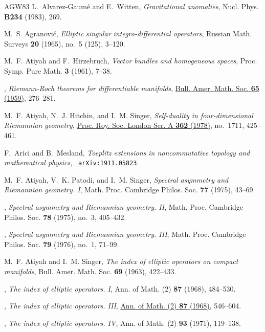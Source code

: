 \documentclass[11pt]{amsart}
\theoremstyle{definition}
\theoremstyle{remark}
\theoremstyle{plain}
\numberwithin{equation}{section}
\renewcommand{\:}{\colon}
\begin{document}
\begin{thebibliography}{AGW83}
L.~Alvarez-Gaum\'e and E.~Witten, \emph{Gravitational anomalies}, Nucl. Phys.
  \textbf{B234} (1983), 269.

M.~S. Agranovi\v{c}, \emph{Elliptic singular integro-differential operators},
  Russian Math. Surveys \textbf{20} (1965), no.~5 (125), 3--120.

M.~F. Atiyah and F.~Hirzebruch, \emph{Vector bundles and homogeneous spaces},
  Proc. Symp. Pure Math. \textbf{3} (1961), 7--38.

\bysame, \emph{Riemann-{R}och theorems for differentiable manifolds},
  \href{http://dx.doi.org/10.1090/S0002-9904-1959-10344-X}{Bull. Amer. Math.
  Soc. \textbf{65} (1959)}, 276--281.

M.~F. Atiyah, N.~J. Hitchin, and I.~M. Singer, \emph{Self-duality in
  four-dimensional {R}iemannian geometry},
  \href{http://dx.doi.org/10.1098/rspa.1978.0143}{Proc. Roy. Soc. London Ser. A
  \textbf{362} (1978)}, no.~1711, 425--461.

F.~Arici and B.~Mesland, \emph{Toeplitz extensions in noncommutative topology
  and mathematical physics}, \href{http://arxiv.org/abs/arXiv:1911.05823}{{\tt
  arXiv:1911.05823}}.

M.~F. Atiyah, V.~K. Patodi, and I.~M. Singer, \emph{Spectral asymmetry and
  {R}iemannian geometry. {I}}, Math. Proc. Cambridge Philos. Soc. \textbf{77}
  (1975), 43--69.

\bysame, \emph{Spectral asymmetry and {R}iemannian geometry. {II}}, Math. Proc.
  Cambridge Philos. Soc. \textbf{78} (1975), no.~3, 405--432.

\bysame, \emph{Spectral asymmetry and {R}iemannian geometry. {III}}, Math.
  Proc. Cambridge Philos. Soc. \textbf{79} (1976), no.~1, 71--99.

M.~F. Atiyah and I.~M. Singer, \emph{The index of elliptic operators on compact
  manifolds}, Bull. Amer. Math. Soc. \textbf{69} (1963), 422--433.

\bysame, \emph{The index of elliptic operators. {I}}, Ann. of Math. (2)
  \textbf{87} (1968), 484--530.

\bysame, \emph{The index of elliptic operators. {III}},
  \href{http://dx.doi.org/10.2307/1970717}{Ann. of Math. (2) \textbf{87}
  (1968)}, 546--604.

\bysame, \emph{The index of elliptic operators. {IV}}, Ann. of Math. (2)
  \textbf{93} (1971), 119--138.


\end{thebibliography}
\end{document}
